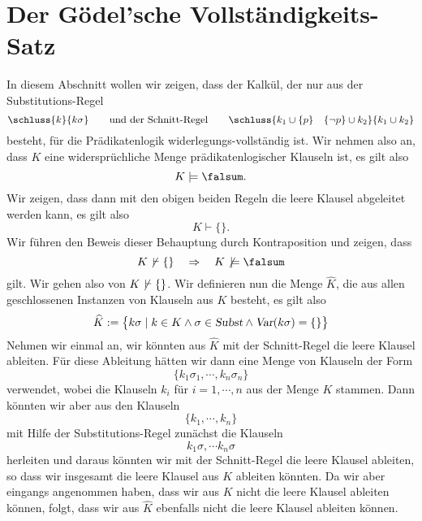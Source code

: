 \section{Der Gödel'sche Vollständigkeits-Satz}
In diesem Abschnitt wollen wir zeigen, dass der Kalkül, der nur aus der Substitutions-Regel
\[ \schluss{k}{k\sigma} \qquad \mbox{und der Schnitt-Regel} \qquad
   \schluss{k_1 \cup \{ p \} \quad \{ \neg p \} \cup k_2}{k_1 \cup k_2} \]
besteht, für die Prädikatenlogik widerlegungs-vollständig ist.  Wir nehmen also an, dass
$K$ eine widersprüchliche Menge prädikatenlogischer Klauseln ist, es gilt also
\[ K \models \falsum. \]
Wir zeigen, dass dann mit den obigen beiden Regeln die leere Klausel abgeleitet werden kann, es gilt
also
\[ K \vdash \{\}. \]
Wir führen den Beweis dieser Behauptung durch Kontraposition und zeigen, dass
\[ K \not\,\vdash \{\} \quad \Rightarrow \quad K \not\,\models \falsum \]
gilt.  Wir gehen also von $K \not\,\vdash \{\}$. 
Wir definieren nun die Menge $\widehat{K}$, die aus allen geschlossenen Instanzen von Klauseln
aus $K$ besteht, es gilt also
\[ \widehat{K} := 
   \bigl\{ k\sigma \mid k \in K \wedge \sigma \in \textsl{Subst} \wedge \textsl{Var}(k\sigma) = \{\} \bigr\} 
\]
Nehmen wir einmal an,  wir könnten aus $\widehat{K}$ mit der Schnitt-Regel die leere Klausel
ableiten.  Für diese Ableitung hätten wir dann eine Menge von Klauseln der Form
\[ \{ k_1\sigma_1, \cdots, k_n\sigma_n \} \]
verwendet, wobei die Klauseln $k_i$ für $i=1,\cdots,n$ aus der Menge $K$ stammen.
Dann könnten wir aber aus den Klauseln
\[ \{ k_1, \cdots, k_n \} \]
mit Hilfe der Substitutions-Regel zunächst die Klauseln 
\[ k_1\sigma, \cdots k_n\sigma  \]
herleiten und daraus könnten wir mit der Schnitt-Regel die leere Klausel ableiten, so dass wir
insgesamt die leere Klausel aus $K$ ableiten könnten.  Da wir aber eingangs angenommen haben, dass
wir aus $K$ nicht die leere Klausel ableiten können, folgt, dass wir aus $\widehat{K}$ ebenfalls
nicht die leere Klausel ableiten können.  

